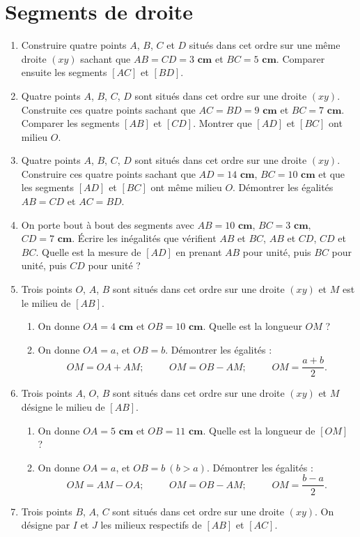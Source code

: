 \documentclass[12 pt]{report}
\theoremstyle{plain}
\newcounter{n}
\newcommand{\cm}{\textbf{ cm}}
\begin{document}
\chapter{Segments de droite}
\begin{enumerate}
\item Construire quatre points $A$, $B$, $C$ et $D$ situés dans cet ordre sur une même droite $(xy)$ sachant que $AB=CD=3\cm$ et $BC = 5\cm$. Comparer ensuite les segments $[AC]$ et $[BD]$. 
\item Quatre points $A$, $B$, $C$, $D$ sont situés dans cet ordre sur une droite $(xy)$. Construite ces quatre points sachant que $AC=BD = 9 \cm$ et $BC = 7\cm$. Comparer les segments $[AB]$ et $[CD]$. Montrer que $[AD]$ et $[BC]$ ont milieu $O$. 
\item Quatre points $A$, $B$, $C$, $D$ sont situés dans cet ordre sur une droite $(xy)$. Construire ces quatre points sachant que $AD= 14\cm$, $BC = 10\cm$ et que les segments $[AD]$ et $[BC]$ ont même milieu $O$. Démontrer les égalités $AB=CD$ et $AC = BD$. 
\item On porte bout à bout des segments avec $AB = 10\cm$, $BC=3\cm$, $CD=7\cm$. Écrire les inégalités que vérifient $AB$ et $BC$, $AB$ et $CD$, $CD$ et $BC$. Quelle est la mesure de $[AD]$ en prenant $AB$ pour unité, puis $BC$ pour unité, puis $CD$ pour unité ? 
\item Trois points $O$, $A$, $B$ sont situés dans cet ordre sur une 
droite $(xy)$ et $M$ est le milieu de $[AB]$. \begin{enumerate}
\item On donne $OA = 4\cm$ et $OB = 10\cm$. Quelle est la longueur $OM$ ? 
\item On donne $OA = a$, et $OB = b$. Démontrer les égalités : 
\[ OM = OA + AM; \phantom{meow} OM = OB - AM;\phantom{meow} OM = \frac{a+b}2.\]
\end{enumerate}
\item Trois points $A$, $O$, $B$ sont situés dans cet ordre sur une droite $(xy)$ et 
$M$ désigne le milieu de $[AB]$. \begin{enumerate}
\item On donne $OA=5\cm$ et $OB = 11\cm$. Quelle est la longueur de $[OM]$ ? 
\item On donne $OA = a$, et $OB = b\ (b>a)$. Démontrer les égalités : 
\[ OM = AM - OA ; \phantom{meow} OM = OB-AM; \phantom{meow} OM = \frac{b-a}2.\]
\end{enumerate}
\item Trois points $B$, $A$, $C$ sont situés dans cet ordre sur une droite $(xy)$. On désigne par $I$ et $J$ les milieux respectifs de $[AB]$ et $[AC]$. 

\end{enumerate}
\end{document}
